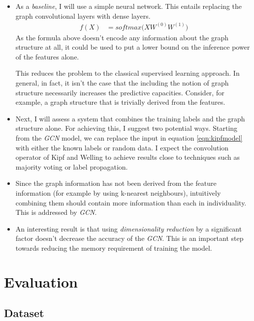 \documentclass[10pt,a4]{article}
\begin{document}
    \begin{itemize} 
    \item As a \emph{baseline}, I will use a simple neural network. This entails 
    replacing the graph convolutional layers with dense layers.
    \begin{align*}
        f(X) &= softmax \big(XW^{(0)}W^{(1)} \big)
    \end{align*}
    As the formula above doesn't encode any information about the graph structure at 
    all, it could be used to put a lower bound on the inference power of the features alone.

    This reduces the problem to the classical supervised learning approach. In general, 
    in fact, it isn't the case that the including the notion of graph structure 
    necessarily increases the predictive capacities. Consider, for example, a graph 
    structure that is trivially derived from the features.

    \item Next, I will assess a system that combines the training labels
    and the graph structure alone. For achieving this, I suggest two potential ways. 
    Starting from the \emph{GCN} model, we can replace the input in equation 
    \ref{eqn:kipfmodel} with either the known labels or random data. 
    I expect the convolution operator of Kipf and Welling to achieve results close 
    to techniques such as majority voting or label propagation.
    
    \item Since the graph information has not been derived from the feature information 
    (for example by using k-nearest neighbours), intuitively combining them should
    contain more information than each in individuality. This is addressed by 
    \emph{GCN}. 
    
    \item An interesting result is that using \emph{dimensionality reduction} by 
    a significant factor doesn't decrease the accuracy of the \emph{GCN}. This is an 
    important step towards reducing the memory requirement of training the model.
    
    \end{itemize}
    \section{Evaluation}
    
    \subsection{Dataset} 
\end{document}
